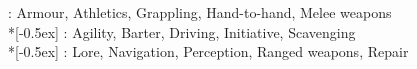
{\footnotesize
{}: Armour, Athletics, Grappling, Hand-to-hand, Melee weapons \\*[-0.5ex]
: Agility, Barter, Driving, Initiative, Scavenging \\*[-0.5ex]
: Lore, Navigation, Perception, Ranged weapons, Repair}
